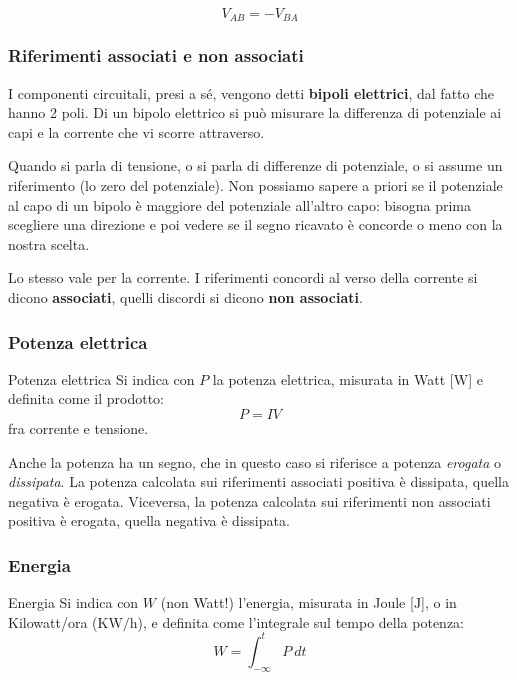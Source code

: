\documentclass[a4paper,11pt]{article}
\begin{document}
$$
V_{AB} = -V_{BA}
$$

\subsubsection{Riferimenti associati e non associati}
I componenti circuitali, presi a sé, vengono detti \textbf{bipoli elettrici}, dal fatto che hanno 2 poli.
Di un bipolo elettrico si può misurare la differenza di potenziale ai capi e la corrente che vi scorre attraverso.

Quando si parla di tensione, o si parla di differenze di potenziale, o si assume un riferimento (lo zero del potenziale).
Non possiamo sapere a priori se il potenziale al capo di un bipolo è maggiore del potenziale all'altro capo: bisogna prima scegliere una direzione e poi vedere se il segno ricavato è concorde o meno con la nostra scelta.

Lo stesso vale per la corrente.
I riferimenti concordi al verso della corrente si dicono \textbf{associati}, quelli discordi si dicono \textbf{non associati}.

\subsubsection{Potenza elettrica}

\begin{definition}{Potenza elettrica}
Si indica con $P$ la potenza elettrica, misurata in Watt [$\mathrm{W}$] e definita come il prodotto:
$$
	P = IV
$$
fra corrente e tensione.
\end{definition}

Anche la potenza ha un segno, che in questo caso si riferisce a potenza \textit{erogata} o \textit{dissipata}.
La potenza calcolata sui riferimenti associati positiva è dissipata, quella negativa è erogata.
Viceversa, la potenza calcolata sui riferimenti non associati positiva è erogata, quella negativa è dissipata.

\subsubsection{Energia}

\begin{definition}{Energia}
Si indica con $W$ (non Watt!) l'energia, misurata in Joule [$\mathrm{J}$], o in Kilowatt/ora ($\mathrm{KW/h}$), e definita come l'integrale sul tempo della potenza:
$$
W = \int_{-\infty}^t P \ dt 
$$
\end{definition}
\end{document}
